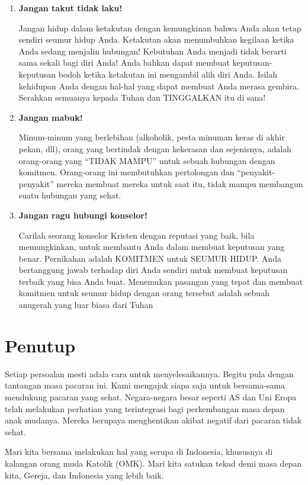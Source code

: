 \documentclass[a4paper,11pt,openany]{article}
\begin{document}
\begin{enumerate}
\item  \textbf{Jangan takut tidak laku!}

Jangan hidup dalam ketakutan dengan kemungkinan bahwa Anda akan tetap sendiri seumur hidup Anda. Ketakutan akan menumbuhkan kegilaan ketika Anda sedang menjalin hubungan! Kebutuhan Anda menjadi tidak berarti sama sekali bagi diri Anda! Anda bahkan dapat membuat keputusan-keputusan bodoh ketika ketakutan ini mengambil alih diri Anda. Isilah kehidupan Anda dengan hal-hal yang dapat membuat Anda merasa gembira. Serahkan semuanya kepada Tuhan dan TINGGALKAN itu di sana!

\item \textbf{Jangan mabuk!}

Minum-minum yang berlebihan (alkoholik, pesta minuman keras di akhir pekan, dll), orang yang bertindak dengan kekerasan dan sejenisnya, adalah orang-orang yang ``TIDAK MAMPU'' untuk sebuah hubungan dengan komitmen. Orang-orang ini membutuhkan pertolongan dan ``penyakit-penyakit'' mereka membuat mereka untuk saat itu, tidak mampu membangun suatu hubungan yang sehat. 

\item \textbf{Jangan ragu hubungi konselor!}

Carilah seorang konselor Kristen dengan reputasi yang baik, bila memungkinkan, untuk membantu Anda dalam membuat keputusan yang benar. Pernikahan adalah KOMITMEN untuk SEUMUR HIDUP. Anda bertanggung jawab terhadap diri Anda sendiri untuk membuat keputusan terbaik yang bisa
Anda buat. Menemukan pasangan yang tepat dan membuat komitmen untuk seumur hidup dengan orang tersebut adalah sebuah anugerah yang luar biasa dari Tuhan
\end{enumerate}

\section*{Penutup}
Setiap persoalan mesti adala cara untuk menyelesaikannya. Begitu pula dengan tantangan masa pacaran ini. Kami mengajak siapa saja untuk bersama-sama mendukung pacaran yang sehat. Negara-negara besar seperti AS dan Uni Eropa telah melakukan perhatian yang terintegrasi bagi perkembangan masa depan anak mudanya. Mereka berupaya menghentikan akibat negatif dari pacaran tidak sehat. 

Mari kita bersama melakukan hal yang serupa di Indonesia, khususnya di kalangan orang muda Katolik (OMK). Mari kita satukan tekad demi masa depan kita, Gereja, dan Indonesia yang lebih baik.

\renewcommand{\bibname}{Referensi}
\renewcommand{\refname}{Referensi}
 

\end{document}

